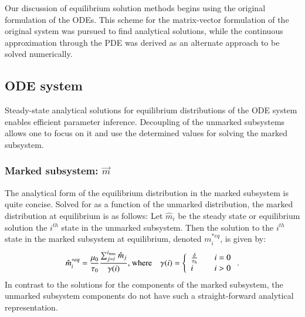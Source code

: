 \documentclass[review]{elsarticle}
\newcommand{\imax}{\ensuremath{i_{\max}}\xspace}
\newcommand{\mstarvec}{\ensuremath{\vec{m}}\xspace}
\begin{document}
Our discussion of equilibrium solution methods begins using the original formulation of the ODEs.
This scheme for the matrix-vector formulation of the original system was pursued to find analytical solutions, while the continuous approximation through the PDE was derived as an alternate approach to be solved numerically.  %

\subsection{ODE system}
Steady-state analytical solutions for equilibrium distributions of the ODE system enables efficient parameter inference.
Decoupling of the unmarked subsystems allows one to focus on it and use the determined values for solving the marked subsystem.  
\subsubsection{Marked subsystem: \mstarvec}
The analytical form of the equilibrium distribution in the marked subsystem is quite concise.
Solved for as a function of the unmarked distribution, the marked distribution at equilibrium is as follows:
Let $\hat{m}_{i}$ be the steady state or equilibrium solution the $i^{th}$ state in the unmarked subsystem.
Then the solution to the $i^{th}$ state in the marked subsystem at equilibrium, denoted $m_{i}^{* eq}$, is given by:
\begin{equation}\label{eq:anyl_marked_eq}
\hat{m}_{i}^{* eq} = \frac{\mu_0}{\tau_0}\frac{\sum_{j=i}^{\imax}\hat{m}_{j}}{\gamma (i)} \text{, where\quad}
\gamma (i) = \left\{
        \begin{array}{ll}
            \frac{\delta}{\tau_0} & \quad i = 0 \\
            i & \quad i > 0
        \end{array}
    \right. .
\end{equation} 
In contrast to the solutions for the components of the marked subsystem, the unmarked subsystem components do not have such a straight-forward analytical representation.
\end{document}
